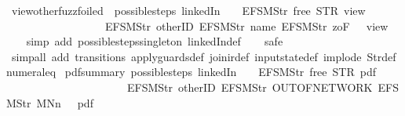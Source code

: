 \begin{isabellebody}
\endisatagproof
{\isafoldproof}%
%
\isadelimproof
\isanewline
%
\endisadelimproof
\isanewline
{}\isamarkupfalse%
\ view{\isacharunderscore}other{\isacharunderscore}fuzz{\isacharunderscore}foiled{\isacharcolon}\ {\isachardoublequoteopen}\ possible{\isacharunderscore}steps\ linkedIn\ {}\ {\isacharparenleft}{\isacharless}{\isachargreater}{\isacharparenleft}{}\ {\isacharcolon}{\isacharequal}\ EFSM{\isachardot}Str\ {\isacharprime}{\isacharprime}free{\isacharprime}{\isacharprime}{\isacharparenright}{\isacharparenright}\ STR\ {\isacharprime}{\isacharprime}view{\isacharprime}{\isacharprime}\isanewline
\ \ \ \ \ \ \ \ \ \ \ \ \ \ \ \ \ \ {\isacharbrackleft}EFSM{\isachardot}Str\ {\isacharprime}{\isacharprime}otherID{\isacharprime}{\isacharprime}{\isacharcomma}\ EFSM{\isachardot}Str\ {\isacharprime}{\isacharprime}name{\isacharprime}{\isacharprime}{\isacharcomma}\ EFSM{\isachardot}Str\ {\isacharprime}{\isacharprime}{}zoF{\isacharprime}{\isacharprime}{\isacharbrackright}\ {\isacharequal}\ {\isacharbraceleft}{\isacharbar}{\isacharparenleft}{}{\isacharcomma}\ view{}{\isacharparenright}{\isacharbar}{\isacharbraceright}{\isachardoublequoteclose}\isanewline
%
\isadelimproof
\ \ %
\endisadelimproof
%
\isatagproof
{}\isamarkupfalse%
\ {\isacharparenleft}simp\ add{\isacharcolon}\ possible{\isacharunderscore}steps{\isacharunderscore}singleton\ linkedIn{\isacharunderscore}def{\isacharparenright}\isanewline
\ \ \isamarkupfalse%
\ safe\isanewline
\ \ \isamarkupfalse%
\ {\isacharparenleft}simp{\isacharunderscore}all\ add{\isacharcolon}\ transitions\ apply{\isacharunderscore}guards{\isacharunderscore}def\ join{\isacharunderscore}ir{\isacharunderscore}def\ input{}state{\isacharunderscore}def\ implode\ Str{\isacharunderscore}def\ numeral{\isacharunderscore}{}{\isacharunderscore}eq{\isacharunderscore}{}{\isacharparenright}%
\endisatagproof
{\isafoldproof}%
%
\isadelimproof
\isanewline
%
\endisadelimproof
\isanewline
{}\isamarkupfalse%
\ pdf{\isacharunderscore}summary{\isacharcolon}\ {\isachardoublequoteopen}possible{\isacharunderscore}steps\ linkedIn\ {}\ {\isacharparenleft}{\isacharless}{\isachargreater}{\isacharparenleft}{}\ {\isacharcolon}{\isacharequal}\ EFSM{\isachardot}Str\ {\isacharprime}{\isacharprime}free{\isacharprime}{\isacharprime}{\isacharparenright}{\isacharparenright}\ STR\ {\isacharprime}{\isacharprime}pdf{\isacharprime}{\isacharprime}\isanewline
\ \ \ \ \ \ \ \ \ \ \ \ \ \ \ \ \ \ \ \ \ \ {\isacharbrackleft}EFSM{\isachardot}Str\ {\isacharprime}{\isacharprime}otherID{\isacharprime}{\isacharprime}{\isacharcomma}\ EFSM{\isachardot}Str\ {\isacharprime}{\isacharprime}OUT{\isacharunderscore}OF{\isacharunderscore}NETWORK{\isacharprime}{\isacharprime}{\isacharcomma}\ EFSM{\isachardot}Str\ {\isacharprime}{\isacharprime}MNn{}{\isacharprime}{\isacharprime}{\isacharbrackright}\ {\isacharequal}\ {\isacharbraceleft}{\isacharbar}{\isacharparenleft}{}{\isacharcomma}\ pdf{}{\isacharparenright}{\isacharbar}{\isacharbraceright}{\isachardoublequoteclose}\isanewline

\end{isabellebody}
